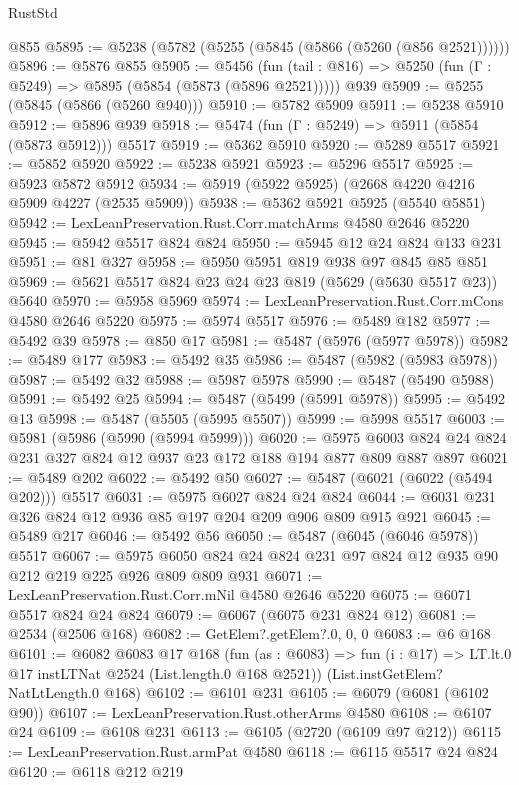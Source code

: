 \begin{lexlean}{RustStd}
\begin{coremodule}
    @855
@5895 := @5238 (@5782 (@5255 (@5845 (@5866 (@5260 (@856 @2521))))))
@5896 := @5876 @855
@5905 := @5456
    (fun (tail : @816) => @5250 (fun (Γ : @5249) => @5895 (@5854 (@5873 (@5896 @2521)))))
    @939
@5909 := @5255 (@5845 (@5866 (@5260 @940)))
@5910 := @5782 @5909
@5911 := @5238 @5910
@5912 := @5896 @939
@5918 := @5474 (fun (Γ : @5249) => @5911 (@5854 (@5873 @5912))) @5517
@5919 := @5362 @5910
@5920 := @5289 @5517
@5921 := @5852 @5920
@5922 := @5238 @5921
@5923 := @5296 @5517
@5925 := @5923 @5872 @5912
@5934 := @5919 (@5922 @5925) (@2668 @4220 @4216 @5909 @4227 (@2535 @5909))
@5938 := @5362 @5921 @5925 (@5540 @5851)
@5942 := LexLeanPreservation.Rust.Corr.matchArms @4580 @2646 @5220
@5945 := @5942 @5517 @824 @824
@5950 := @5945 @12 @24 @824 @133 @231
@5951 := @81 @327
@5958 := @5950 @5951 @819 @938 @97 @845 @85 @851
@5969 := @5621 @5517 @824 @23 @24 @23 @819 (@5629 (@5630 @5517 @23)) @5640
@5970 := @5958 @5969
@5974 := LexLeanPreservation.Rust.Corr.mCons @4580 @2646 @5220
@5975 := @5974 @5517
@5976 := @5489 @182
@5977 := @5492 @39
@5978 := @850 @17
@5981 := @5487 (@5976 (@5977 @5978))
@5982 := @5489 @177
@5983 := @5492 @35
@5986 := @5487 (@5982 (@5983 @5978))
@5987 := @5492 @32
@5988 := @5987 @5978
@5990 := @5487 (@5490 @5988)
@5991 := @5492 @25
@5994 := @5487 (@5499 (@5991 @5978))
@5995 := @5492 @13
@5998 := @5487 (@5505 (@5995 @5507))
@5999 := @5998 @5517
@6003 := @5981 (@5986 (@5990 (@5994 @5999)))
@6020 := @5975 @6003 @824 @24 @824 @231 @327 @824 @12 @937 @23 @172 @188 @194 @877 @809 @887 @897
@6021 := @5489 @202
@6022 := @5492 @50
@6027 := @5487 (@6021 (@6022 (@5494 @202))) @5517
@6031 := @5975 @6027 @824 @24 @824
@6044 := @6031 @231 @326 @824 @12 @936 @85 @197 @204 @209 @906 @809 @915 @921
@6045 := @5489 @217
@6046 := @5492 @56
@6050 := @5487 (@6045 (@6046 @5978)) @5517
@6067 := @5975 @6050 @824 @24 @824 @231 @97 @824 @12 @935 @90 @212 @219 @225 @926 @809 @809 @931
@6071 := LexLeanPreservation.Rust.Corr.mNil @4580 @2646 @5220
@6075 := @6071 @5517 @824 @24 @824
@6079 := @6067 (@6075 @231 @824 @12)
@6081 := @2534 (@2506 @168)
@6082 := GetElem?.getElem?.{0, 0, 0}
@6083 := @6 @168
@6101 := @6082
    @6083
    @17
    @168
    (fun (as : @6083) =>
    fun (i : @17) => LT.lt.{0} @17 instLTNat @2524 (List.length.{0} @168 @2521))
    (List.instGetElem?NatLtLength.{0} @168)
@6102 := @6101 @231
@6105 := @6079 (@6081 (@6102 @90))
@6107 := LexLeanPreservation.Rust.otherArms @4580
@6108 := @6107 @24
@6109 := @6108 @231
@6113 := @6105 (@2720 (@6109 @97 @212))
@6115 := LexLeanPreservation.Rust.armPat @4580
@6118 := @6115 @5517 @24 @824
@6120 := @6118 @212 @219

\end{coremodule}
\end{lexlean}
